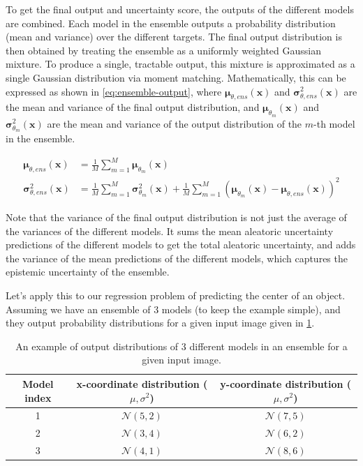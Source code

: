 To get the final output and uncertainty score, the outputs of the different models are combined.
Each model in the ensemble outputs a probability distribution (mean and variance) over the different targets.
The final output distribution is then obtained by treating the ensemble as a uniformly weighted Gaussian mixture.
To produce a single, tractable output, this mixture is approximated as a single Gaussian distribution via moment matching.
Mathematically, this can be expressed as shown in \cref{eq:ensemble-output}, where $\bm{\mu}_{\theta, ens}(\mathbf{x})$ and $\bm{\sigma}^2_{\theta, ens}(\mathbf{x})$ are the mean and variance of the final output distribution, and $\bm{\mu}_{\theta_m}(\mathbf{x})$ and $\bm{\sigma}^2_{\theta_m}(\mathbf{x})$ are the mean and variance of the output distribution of the $m$-th model in the ensemble.

\begin{equation}\label{eq:ensemble-output}
    \begin{aligned}
        \bm{\mu}_{\theta, ens}(\mathbf{x}) &= \frac{1}{M} \sum_{m=1}^{M} \bm{\mu}_{\theta_m}(\mathbf{x}) \\
        \bm{\sigma}^2_{\theta, ens}(\mathbf{x}) &= \frac{1}{M} \sum_{m=1}^{M} \bm{\sigma}^2_{\theta_m}(\mathbf{x}) + \frac{1}{M} \sum_{m=1}^{M} (\bm{\mu}_{\theta_m}(\mathbf{x}) - \bm{\mu}_{\theta, ens}(\mathbf{x}))^2
    \end{aligned}
\end{equation}

Note that the variance of the final output distribution is not just the average of the variances of the different models.
It sums the mean aleatoric uncertainty predictions of the different models to get the total aleatoric uncertainty, and adds the variance of the mean predictions of the different models, which captures the epistemic uncertainty of the ensemble.

Let's apply this to our regression problem of predicting the center of an object.
Assuming we have an ensemble of 3 models (to keep the example simple), and they output probability distributions for a given input image given in \cref{tab:ensemble-output}.

\begin{table}[]
    \centering
    \begin{tabular}{c|c|c}
        \textbf{Model index} & \textbf{x-coordinate distribution ($\mu, \sigma^2$)} & \textbf{y-coordinate distribution ($\mu, \sigma^2$)} \\
        \hline
        1 & $\mathcal{N}(5, 2)$ & $\mathcal{N}(7, 5)$ \\
        2 & $\mathcal{N}(3, 4)$ & $\mathcal{N}(6, 2)$ \\
        3 & $\mathcal{N}(4, 1)$ & $\mathcal{N}(8, 6)$ \\
    \end{tabular}
    \caption{An example of output distributions of 3 different models in an ensemble for a given input image.}
    \label{tab:ensemble-output}
\end{table}

